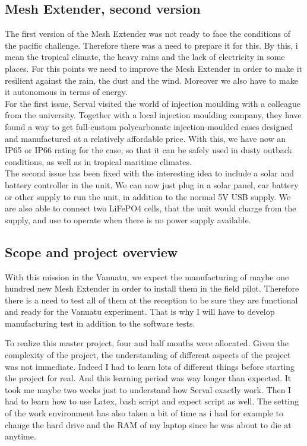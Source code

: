 \subsection{Mesh Extender, second version}
The first version of the Mesh Extender was not ready to face the conditions of the pacific challenge. Therefore there was a need to prepare it for this. By this, i mean the tropical climate, the heavy rains and the lack of electricity in some places. For this points we need to improve the Mesh Extender in order to make it resilient against the rain, the dust and the wind. Moreover we also have to make it autonomous in terms of energy. \\
For the first issue, Serval visited the world of injection moulding with a colleague from the university. Together with a local injection moulding company, they have found a way to get full-custom polycarbonate injection-moulded cases designed and manufactured at a relatively affordable price. With this, we have now an IP65 or IP66 rating for the case, so that it can be safely used in dusty outback conditions, as well as in tropical maritime climates.\\
The second issue has been fixed with the interesting idea to include a solar and battery controller in the unit. We can now just plug in a solar panel, car battery or other supply to run the unit, in addition to the normal 5V USB supply.  We are also able to connect two LiFePO4 cells, that the unit would charge from the supply, and use to operate when there is no power supply available. 

\subsection{Scope and project overview}
With this mission in the Vanuatu, we expect the manufacturing of maybe one hundred new Mesh Extender in order to install them in the field pilot. Therefore there is a need to test all of them at the reception to be sure they are functional and ready for the Vanuatu experiment. That is why I will have to develop manufacturing test in addition to the software tests. 
\par
To realize this master project, four and half months were allocated. Given the complexity of the project, the understanding of different aspects of the project was not immediate. Indeed I had to learn lots of different things before starting the project for real. And this learning period was way longer than expected. It took me maybe two weeks just to understand how Serval exactly work. Then I had to learn how to use Latex, bash script and expect script as well. The setting of the work environment has also taken a bit of time as i had for example to change the hard drive and the RAM of my laptop since he was about to die at anytime. 